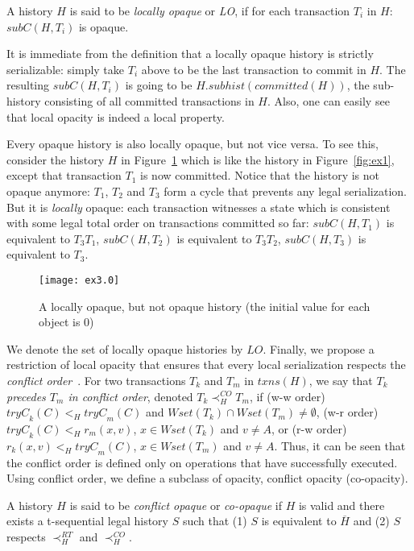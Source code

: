 \documentclass{llncs}
\newcommand{\cmnt}[1]{}
\newcommand{\op} {operation}
\newcommand{\lo} {\textit{LO}}
\newcommand{\comm}{\textit{committed}}
\newcommand{\txns}{\textit{txns}}
\newcommand{\valid} {valid}
\newcommand{\subs}[2]  {\textit{subC}(#2,#1)}
\newcommand{\shist}[2]  {#2.subhist(#1)}
\newcommand{\tryc} {\textit{tryC}}
\newcommand{\coop} {co-opaque}
\newcommand{\coopty} {co-opacity}
\begin{document}
\begin{definition}
\label{def:lo}
A history $H$ is said to be \emph{locally opaque} or \emph{LO},
if for each transaction $T_i$ in $H$:
$\subs{T_i}{H}$ is opaque. 
\end{definition}

It is immediate from the definition that a locally opaque history is
strictly serializable: 
simply take $T_i$ above to be the last transaction to commit  in $H$. 
The resulting $\subs{T_i}{H}$ is going to be $\shist{\comm(H)}{H}$, 
the sub-history consisting of all committed transactions in $H$.     
Also, one can easily see that local opacity is indeed a local property. 

Every opaque history is also locally opaque, but not vice versa.  
To see this, consider the history $H$ in Figure~\ref{fig:ex3} which is like the
history in  Figure~\ref{fig:ex1}, except that transaction $T_1$ is now
committed.
Notice that the history is not opaque anymore: $T_1$, $T_2$ and $T_3$
form a cycle that prevents any legal serialization.
But it is \emph{locally} opaque: each transaction witnesses a state which is
consistent with some legal total order on transactions committed so far:
$\subs{T_1}{H}$ is equivalent to $T_3 T_1$, 
$\subs{T_2}{H}$ is equivalent to $T_3 T_2$, 
$\subs{T_3}{H}$ is equivalent to $T_3$.


\begin{figure}[tbph]
  \centering
\texttt{[image: ex3.0]}
\caption{A locally opaque, but not opaque history (the initial value for each
object is $0$)}
  \label{fig:ex3}
\end{figure}

We denote the set of locally opaque histories by $\lo$. Finally, we
propose a restriction of local  opacity that  ensures that every local
serialization respects the \textit{conflict
  order}~\cite[Chap. 3]{WeiVoss:2002:Morg}. 
For two transactions $T_k$ and $T_m$ in $\txns(H)$, we say that \emph{$T_k$
  precedes $T_m$ in conflict order}, denoted $T_k \prec_H^{CO} T_m$, 
if (w-w order) $\tryc_k(C)<_H \tryc_m(C)$ and $Wset(T_k) \cap
Wset(T_m) \neq\emptyset$, 
(w-r order) $\tryc_k(C)<_H r_m(x,v)$, $x \in Wset(T_k)$ and $v \neq
A$, or (r-w order) 
$r_k(x,v)<_H \tryc_m(C)$, $x\in Wset(T_m)$ and $v \neq A$.
Thus, it can be seen that the conflict order is defined only on \op{s}
that have successfully executed. 
Using conflict order, we define a subclass of opacity, conflict opacity (\coopty). 
\begin{definition}
\label{def:coop1}
A history $H$ is said to be \emph{conflict opaque} or \emph{\coop} if $H$ is \valid{} 
and there exists a t-sequential legal history $S$ such that (1) $S$ is equivalent to
$\overline{H}$ and (2) $S$ respects $\prec_{H}^{RT}$ and $\prec_{H}^{CO}$. 
\end{definition}
\cmnt{Readers familiar with the databases literature may notice \coopty{} 
is analogous to the \emph{order commit conflict serializability} (OCSR)~\cite{WeiVoss:2002:Morg}.}
\end{document}
